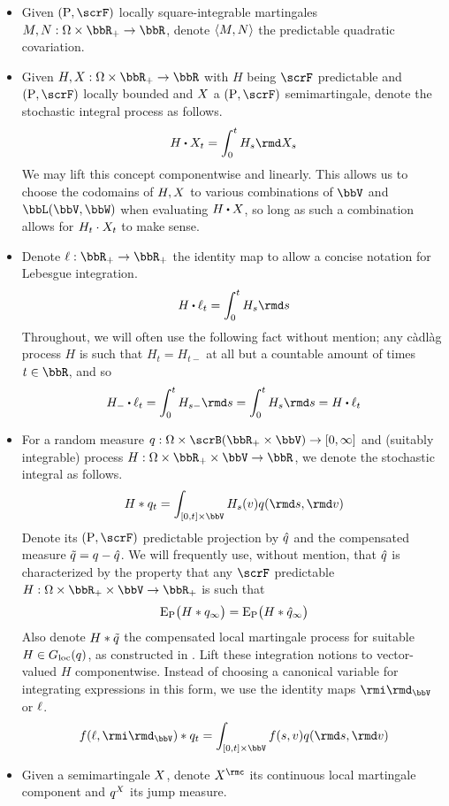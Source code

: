 \begin{itemize}
  \item
    Given $(\Prb,\scrF)$ locally square-integrable martingales $M, N: \Omega \times \bbR_+ \rightarrow \bbR$, denote ${\langle M , N \rangle}$ the predictable quadratic covariation.
  \item
    Given $H,\X: \Omega \times \bbR_+ \rightarrow \bbR$ with $H$ being $\scrF$ predictable and $(\Prb, \scrF)$ locally bounded and $X$ a $(\Prb, \scrF)$ semimartingale, denote the stochastic integral process as follows.
    \[
      H\shortInt \X_t = \int_0^t H_s \rmd\X_s
    \]
    We may lift this concept componentwise and linearly.
    This allows us to choose the codomains of $H, X$ to various combinations of $\vecSpace$ and $\bbL(\vecSpace, \bbW)$ when evaluating $H \shortInt \X$, so long as such a combination allows for $H_t \cdot X_t$ to make sense.
  \item
    Denote $\leb: \bbR_+ \rightarrow \bbR_+$ the identity map to allow a concise notation for Lebesgue integration.
    \[
      H \shortInt \leb_t = \int_0^t H_s \rmd s
    \]
    Throughout, we will often use the following fact without mention; any c\`adl\`ag process $H$ is such that $H_t=H_{t-}$ at all but a countable amount of times $t \in \bbR$, and so 
    \[
      H_- \shortInt \leb_t = \int_0^t H_{s-} \rmd s = \int_0^t H_s \rmd s = H \shortInt \leb_t
    \]
  \item
    For a random measure $\jumpMeas: \Omega \times \scrB(\bbR_+ \times \vecSpace) \rightarrow [0,\infty]$ and (suitably integrable) process $H: \Omega \times \bbR_+ \times \vecSpace \rightarrow \bbR$, we denote the stochastic integral as follows.
    \[
      H \ast \jumpMeas_t = \int_{[0,t] \times \vecSpace} H_s(\markVar) \jumpMeas(\rmd s, \rmd\markVar)
    \]
    Denote its $(\Prb, \scrF)$ predictable projection by $\hat{q}$ and the compensated measure $\tilde{q} = q - \hat{q}$.
    We will frequently use, without mention, that $\hat{q}$ is characterized by the property that any $\scrF$ predictable $H: \Omega \times \bbR_+ \times \vecSpace \rightarrow \bbR_+$ is such that
    \[
      {\operatorname{E}}_{\operatorname{P}}\big( H \ast q_\infty \big)
      = {\operatorname{E}}_{\operatorname{P}}\big( H \ast \hat{q}_\infty \big)
    \]
    Also denote $H \ast \tilde{q}$ the compensated local martingale process for suitable $H \in G_{\operatorname{loc}}(q)$, as constructed in \cite[Definition II.1.27]{jacod2003}.
    Lift these integration notions to vector-valued $H$ componentwise.
    Instead of choosing a canonical variable for integrating expressions in this form, we use the identity maps $\id_\vecSpace$ or $\ell$.
    \[
      f(\leb, \id_\vecSpace) \ast \jumpMeas_t = \int_{[0,t] \times \vecSpace} f(s, \markVar) \jumpMeas(\rmd s, \rmd\markVar)
    \]
  \item
    Given a semimartingale $X$, denote $\X^\rmc$ its continuous local martingale component and $q^X$ its jump measure.
\end{itemize}
